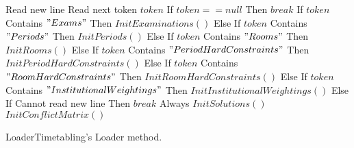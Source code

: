 \begin{algorithm}
\begin{algorithmic}[1]
\State Read new line
\Repeat
	\State Read next token $token$
	\State If $token == null$ Then $break$ 
	\State If $token$ Contains $"Exams"$ Then $InitExaminations()$
	\State Else If $token$ Contains $"Periods"$ Then $InitPeriods()$
	\State Else If $token$ Contains $"Rooms"$ Then $InitRooms()$
	\State Else If $token$ Contains $"PeriodHardConstraints"$ Then $InitPeriodHardConstraints()$
	\State Else If $token$ Contains $"RoomHardConstraints"$ Then $InitRoomHardConstraints()$
	\State Else If $token$ Contains $"InstitutionalWeightings"$ Then $InitInstitutionalWeightings()$
	\State Else If Cannot read new line Then $break$ 
\Until Always
\State $InitSolutions()$
\State $InitConflictMatrix()$
\end{algorithmic}
\caption{LoaderTimetabling's Loader method.}
\label{alg:GDA}
\end{algorithm}